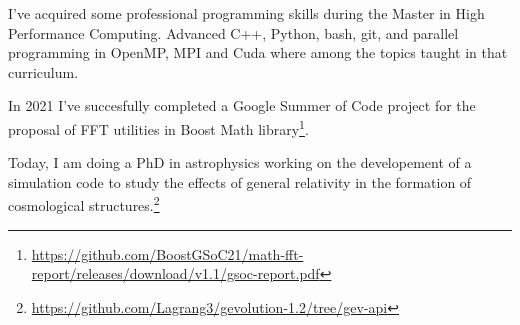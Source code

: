 I've acquired some professional programming skills during the Master in High
Performance Computing. Advanced C++, Python, bash, git, and parallel programming
in OpenMP, MPI and Cuda where among the topics taught in that curriculum.

In 2021 I've succesfully completed a Google Summer of Code project for the
proposal of FFT utilities in Boost Math 
library\footnote{\url{https://github.com/BoostGSoC21/math-fft-report/releases/download/v1.1/gsoc-report.pdf}}.

Today, I am doing a PhD in astrophysics working on the developement of a
simulation code
to study the effects of general relativity in the formation of cosmological
structures.\footnote{\url{https://github.com/Lagrang3/gevolution-1.2/tree/gev-api}}
